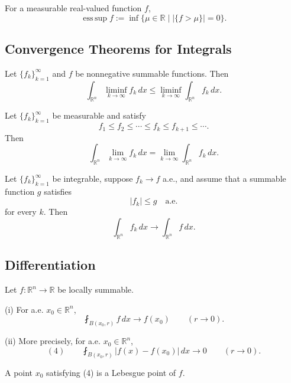 \begin{definition}
\label{def:essential-supremum}
For a measurable real-valued function $f$,
\[
\operatorname*{ess\,sup}f
:=\inf\{\mu\in\mathbb R\mid |\{f>\mu\}|=0\}.
\]
\end{definition}

\subsection{Convergence Theorems for Integrals}
\label{sec:convergence-theorems-for-integrals}

\begin{theorem}
\label{thm:fatous-lemma}

Let $\{f_k\}_{k=1}^\infty$ and $f$ be nonnegative summable functions. Then
\[
\int_{\mathbb R^n}\liminf_{k\to\infty}f_k\,dx
\leq\liminf_{k\to\infty}\int_{\mathbb R^n}f_k\,dx.
\]
\end{theorem}

\begin{theorem}
\label{thm:monotone-convergence-theorem}

Let $\{f_k\}_{k=1}^\infty$ be measurable and satisfy
\[
f_1\leq f_2\leq\cdots\leq f_k\leq f_{k+1}\leq\cdots.
\]
Then
\[
\int_{\mathbb R^n}\lim_{k\to\infty}f_k\,dx
=\lim_{k\to\infty}\int_{\mathbb R^n}f_k\,dx.
\]
\end{theorem}

\begin{theorem}
\label{thm:dominated-convergence-theorem}

Let $\{f_k\}_{k=1}^\infty$ be integrable, suppose $f_k\to f$ a.e., and assume
that a summable function $g$ satisfies
\[
|f_k|\leq g\quad\text{a.e.}
\]
for every $k$. Then
\[
\int_{\mathbb R^n}f_k\,dx\to\int_{\mathbb R^n}f\,dx.
\]
\end{theorem}

\subsection{Differentiation}
\label{sec:differentiation}

\begin{theorem}
\label{thm:lebesgue-differentiation-theorem}

Let $f:\mathbb R^n\to\mathbb R$ be locally summable.

(i) For a.e. $x_0\in\mathbb R^n$,
\[
\fint_{B(x_0,r)}f\,dx\to f(x_0)\qquad(r\to0).
\]

(ii) More precisely, for a.e. $x_0\in\mathbb R^n$,
\[
(4)\qquad
\fint_{B(x_0,r)}|f(x)-f(x_0)|\,dx\to0
\qquad(r\to0).
\]

A point $x_0$ satisfying (4) is a Lebesgue point of $f$.
\end{theorem}

